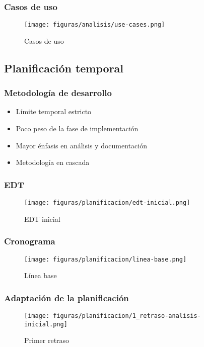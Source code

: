 \documentclass{beamer}
\begin{document}
\begin{frame}
    \frametitle{Casos de uso}
    \begin{figure}[H]
        \centerline{\texttt{[image: figuras/analisis/use-cases.png]}}
        \caption{Casos de uso}
        \label{fig:use-cases}
    \end{figure}
\end{frame}

\subsection{Planificación temporal}

\begin{frame}
    \frametitle{Metodología de desarrollo}   
    \begin{itemize}
        \item Límite temporal estricto \pause
        \item Poco peso de la fase de implementación \pause
        \item Mayor énfasis en análisis y documentación \pause
        \item Metodología en cascada
    \end{itemize} 
\end{frame}

\begin{frame}[plain]
    \frametitle{EDT}
    \begin{figure}[H]
        \centerline{\texttt{[image: figuras/planificacion/edt-inicial.png]}}
        \caption{EDT inicial}
    \end{figure}
\end{frame}

\begin{frame}[plain]
    \frametitle{Cronograma}
    \begin{figure}[H]
        \centerline{\texttt{[image: figuras/planificacion/linea-base.png]}}
        \caption{Línea base}
    \end{figure}
\end{frame}

\begin{frame}[plain]
    \frametitle{Adaptación de la planificación}
    \begin{figure}[H]
        \centerline{\texttt{[image: figuras/planificacion/1\_retraso-analisis-inicial.png]}}
        \caption{Primer retraso}
    \end{figure}
\end{frame}
\end{document}
